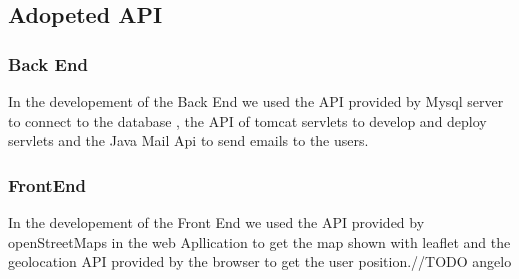 \subsection{Adopeted API}
\subsubsection{Back End}
In the developement of the Back End we used the API provided by Mysql server to connect to the database , the API of tomcat servlets to develop and deploy servlets and the Java Mail Api to send emails to the users.
\subsubsection{FrontEnd}
In the developement of the Front End we used the API provided by openStreetMaps in the web Apllication to get the map shown with leaflet and the geolocation API provided by the browser to get the user position.//TODO angelo


